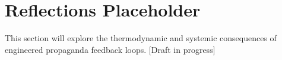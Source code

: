\section*{Reflections Placeholder}
This section will explore the thermodynamic and systemic consequences of
 engineered propaganda feedback loops. [Draft in progress]


